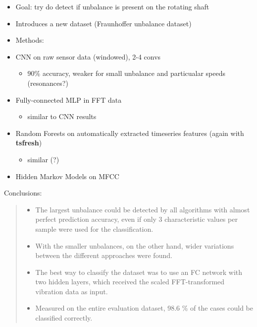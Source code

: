 \documentclass[
  letterpaper,
  DIV=11,
  numbers=noendperiod]{scrartcl}
\providecommand{\tightlist}{%
  \setlength{\itemsep}{0pt}\setlength{\parskip}{0pt}}\usepackage{longtable,booktabs,array}
\begin{document}
\begin{itemize}
\item
  Goal: try do detect if unbalance is present on the rotating shaft
\item
  Introduces a new dataset (Fraunhoffer unbalance dataset)
\item
  Methods:
\item
  CNN on raw sensor data (windowed), 2-4 convs

  \begin{itemize}
  \tightlist
  \item
    90\% accuracy, weaker for small unbalance and particualar speeds
    (resonances?)
  \end{itemize}
\item
  Fully-connected MLP in FFT data

  \begin{itemize}
  \tightlist
  \item
    similar to CNN results
  \end{itemize}
\item
  Random Forests on automatically extracted timeseries features (again
  with \textbf{tsfresh})

  \begin{itemize}
  \tightlist
  \item
    similar (?)
  \end{itemize}
\item
  Hidden Markov Models on MFCC
\end{itemize}

Conclusions:

\begin{quote}
\begin{itemize}
\tightlist
\item
  The largest unbalance could be detected by all algorithms with almost
  perfect prediction accuracy, even if only 3 characteristic values per
  sample were used for the classification.
\item
  With the smaller unbalances, on the other hand, wider variations
  between the different approaches were found.
\item
  The best way to classify the dataset was to use an FC network with two
  hidden layers, which received the scaled FFT-transformed vibration
  data as input.
\item
  Measured on the entire evaluation dataset, 98.6 \% of the cases could
  be classified correctly.
\end{itemize}
\end{quote}
\end{document}

